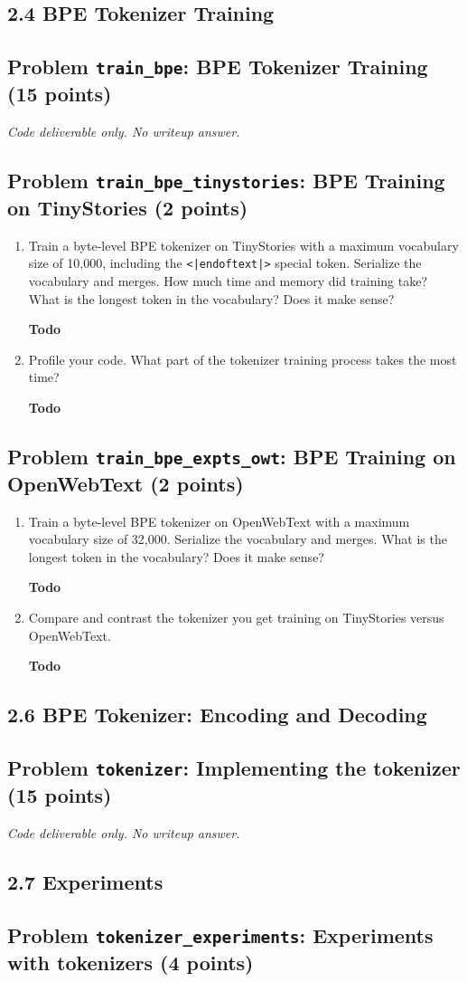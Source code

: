 \documentclass[11pt]{article}
\newcommand{\Todo}{\par\textbf{Todo}\par}
\newcommand{\CodeOnly}{\par\emph{Code deliverable only. No writeup answer.}\par}
\newcommand{\problem}[2]{%
  \subsection*{Problem \texttt{#1}: #2}%
}
\begin{document}
\subsection*{2.4 BPE Tokenizer Training}

\problem{train\_bpe}{BPE Tokenizer Training (15 points)}

\CodeOnly

\problem{train\_bpe\_tinystories}{BPE Training on TinyStories (2 points)}

\begin{enumerate}[label=(\alph*)]
  \item Train a byte-level BPE tokenizer on TinyStories with a maximum vocabulary size of 10,000, including the \texttt{<|endoftext|>} special token. Serialize the vocabulary and merges. How much time and memory did training take? What is the longest token in the vocabulary? Does it make sense?
  \Todo
  \item Profile your code. What part of the tokenizer training process takes the most time?
  \Todo
\end{enumerate}

\problem{train\_bpe\_expts\_owt}{BPE Training on OpenWebText (2 points)}

\begin{enumerate}[label=(\alph*)]
  \item Train a byte-level BPE tokenizer on OpenWebText with a maximum vocabulary size of 32,000. Serialize the vocabulary and merges. What is the longest token in the vocabulary? Does it make sense?
  \Todo
  \item Compare and contrast the tokenizer you get training on TinyStories versus OpenWebText.
  \Todo
\end{enumerate}

\subsection*{2.6 BPE Tokenizer: Encoding and Decoding}

\problem{tokenizer}{Implementing the tokenizer (15 points)}

\CodeOnly

\subsection*{2.7 Experiments}

\problem{tokenizer\_experiments}{Experiments with tokenizers (4 points)}
\end{document}
